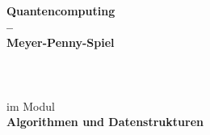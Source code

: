 
\begin{titlepage}
		{}
	\enlargethispage{20mm}
	\begin{center}
		\vspace*{18mm}	{\huge\textbf {Quantencomputing} }\\
		\vspace*{5mm}	{\huge\textbf {--} }\\
		\vspace*{5mm}	{\huge\textbf {Meyer-Penny-Spiel} }\\
		\vspace*{22mm}	{\large\textbf \arbeit}\\
		\vspace*{8mm}	\langartikelstudiengang{} \langstudiengang{} \studiengang\\
    \vspace*{3mm}		\langanderdh{} \dhbw\\
		\vspace*{12mm}	{im Modul}\\
		\vspace*{3mm}	{\large\textbf {Algorithmen und Datenstrukturen}}\\



\end{center}
\end{titlepage}

